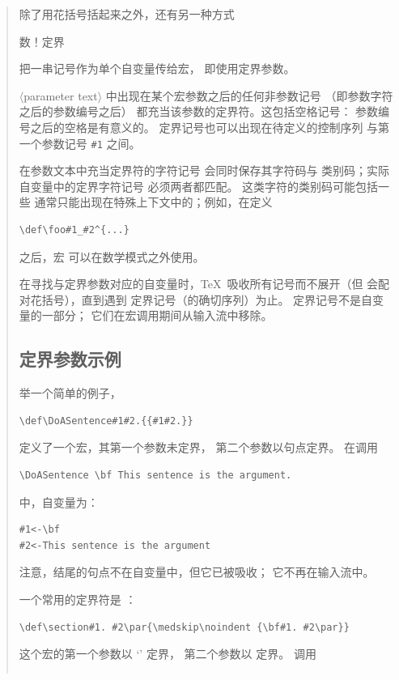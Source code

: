 \documentclass[a4paper]{rapport3}
\def\gr#1{$\langle$#1$\rangle$}\def\key#1{{\tt#1}}
\newenvironment{disp}{\begin{quotation}}{\end{quotation}}
\def\term#1\par{\index{#1}}
\begin{document}
\begin{disp}
除了用花括号括起来之外，还有另一种方式
\term 参数！定界\par
把一串记号作为单个自变量传给宏，
即使用定界参数。

\gr{parameter text} 中出现在某个宏参数之后的任何非参数记号
（即参数字符之后的参数编号之后）
都充当该参数的定界符。这包括空格记号：
参数编号之后的空格是有意义的。
定界记号也可以出现在待定义的控制序列
与第一个参数记号 \verb>#1> 之间。

在参数文本中充当定界符的字符记号
会同时保存其字符码与
类别码；实际自变量中的定界字符记号
必须两者都匹配。
这类字符的类别码可能包括一些
通常只能出现在特殊上下文中的；例如，在定义 \begin{verbatim}
\def\foo#1_#2^{...}
\end{verbatim}
之后，宏 
可以在数学模式之外使用。

在寻找与定界参数对应的自变量时，\TeX\ 吸收所有记号而不展开（但
会配对花括号），直到遇到
定界记号（的确切序列）为止。
定界记号不是自变量的一部分；
它们在宏调用期间从输入流中移除。

\subsection{定界参数示例}

举一个简单的例子，\begin{verbatim}
\def\DoASentence#1#2.{{#1#2.}}
\end{verbatim}
定义了一个宏，其第一个参数未定界，
第二个参数以句点定界。
在调用\begin{verbatim}
\DoASentence \bf This sentence is the argument.
\end{verbatim}
中，自变量为：
\begin{verbatim}
#1<-\bf
#2<-This sentence is the argument
\end{verbatim}
注意，结尾的句点不在自变量中，但它已被吸收；
它不再在输入流中。

一个常用的定界符是 ：
\begin{verbatim}
\def\section#1. #2\par{\medskip\noindent {\bf#1. #2\par}}
\end{verbatim}
这个宏的第一个参数以 `' 定界，
第二个参数以  定界。
调用
\begin{verbatim}

\end{verbatim}
\end{disp}
\end{document}
